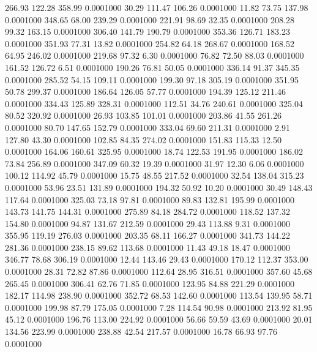  266.93  122.28  358.99   0.0001000
  30.29  111.47  106.26   0.0001000
  11.82   73.75  137.98   0.0001000
 348.65   68.00  239.29   0.0001000
 221.91   98.69   32.35   0.0001000
 208.28   99.32  163.15   0.0001000
 306.40  141.79  190.79   0.0001000
 353.36  126.71  183.23   0.0001000
 351.93   77.31   13.82   0.0001000
 254.82   64.18  268.67   0.0001000
 168.52   64.95  246.02   0.0001000
 219.68   97.32    6.30   0.0001000
  76.82   72.50   88.03   0.0001000
 161.52  126.72    6.51   0.0001000
 190.26   76.81   50.05   0.0001000
 336.14   91.37  345.35   0.0001000
 285.52   54.15  109.11   0.0001000
 199.30   97.18  305.19   0.0001000
 351.95   50.78  299.37   0.0001000
 186.64  126.05   57.77   0.0001000
 194.39  125.12  211.46   0.0001000
 334.43  125.89  328.31   0.0001000
 112.51   34.76  240.61   0.0001000
 325.04   80.52  320.92   0.0001000
  26.93  103.85  101.01   0.0001000
 203.86   41.55  261.26   0.0001000
  80.70  147.65  152.79   0.0001000
 333.04   69.60  211.31   0.0001000
   2.91  127.80   43.30   0.0001000
 102.85   84.35  274.02   0.0001000
 151.83  115.33   12.50   0.0001000
 164.06  160.61  325.95   0.0001000
  18.74  122.53  191.95   0.0001000
 186.02   73.84  256.89   0.0001000
 347.09   60.32   19.39   0.0001000
  31.97   12.30    6.06   0.0001000
 100.12  114.92   45.79   0.0001000
  15.75   48.55  217.52   0.0001000
  32.54  138.04  315.23   0.0001000
  53.96   23.51  131.89   0.0001000
 194.32   50.92   10.20   0.0001000
  30.49  148.43  117.64   0.0001000
 325.03   73.18   97.81   0.0001000
  89.83  132.81  195.99   0.0001000
 143.73  141.75  144.31   0.0001000
 275.89   84.18  284.72   0.0001000
 118.52  137.32  154.80   0.0001000
  94.87  131.67  212.59   0.0001000
  29.43  113.88    9.31   0.0001000
 355.95  119.19  276.03   0.0001000
 203.35   68.11  166.27   0.0001000
 341.73  144.22  281.36   0.0001000
 238.15   89.62  113.68   0.0001000
  11.43   49.18   18.47   0.0001000
 346.77   78.68  306.19   0.0001000
  12.44  143.46   29.43   0.0001000
 170.12  112.37  353.00   0.0001000
  28.31   72.82   87.86   0.0001000
 112.64   28.95  316.51   0.0001000
 357.60   45.68  265.45   0.0001000
 306.41   62.76   71.85   0.0001000
 123.95   84.88  221.29   0.0001000
 182.17  114.98  238.90   0.0001000
 352.72   68.53  142.60   0.0001000
 113.54  139.95   58.71   0.0001000
 199.98   87.79  175.05   0.0001000
   7.28  114.54   90.98   0.0001000
 213.92   81.95   45.12   0.0001000
 196.76  113.00  224.92   0.0001000
  56.66   59.59   43.69   0.0001000
  20.01  134.56  223.99   0.0001000
 238.88   42.54  217.57   0.0001000
  16.78   66.93   97.76   0.0001000
